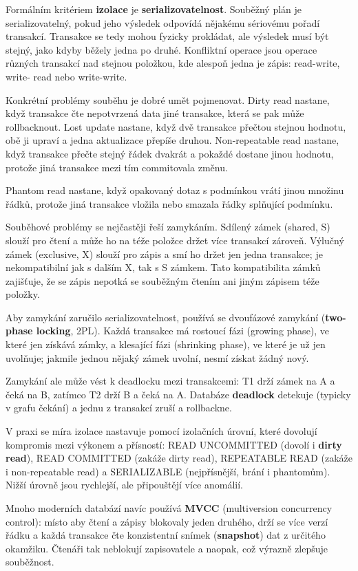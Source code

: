 \documentclass[11pt,a4paper]{article}
\begin{document}
Formálním kritériem \textbf{izolace} je \textbf{serializovatelnost}. Souběžný plán je serializovatelný, pokud jeho výsledek odpovídá nějakému sériovému pořadí transakcí. Transakce se tedy mohou fyzicky prokládat, ale výsledek musí být stejný, jako kdyby běžely jedna po druhé. Konfliktní operace jsou operace různých transakcí nad stejnou položkou, kde alespoň jedna je zápis: read-write, write- read nebo write-write.

Konkrétní problémy souběhu je dobré umět pojmenovat. Dirty read nastane, když transakce čte nepotvrzená data jiné transakce, která se pak může rollbacknout. Lost update nastane, když dvě transakce přečtou stejnou hodnotu, obě ji upraví a jedna aktualizace přepíše druhou. Non-repeatable read nastane, když transakce přečte stejný řádek dvakrát a pokaždé dostane jinou hodnotu, protože jiná transakce mezi tím commitovala změnu.

Phantom read nastane, když opakovaný dotaz s podmínkou vrátí jinou množinu řádků, protože jiná transakce vložila nebo smazala řádky splňující podmínku.

Souběhové problémy se nejčastěji řeší zamykáním. Sdílený zámek (shared, S) slouží pro čtení a může ho na téže položce držet více transakcí zároveň. Výlučný zámek (exclusive, X) slouží pro zápis a smí ho držet jen jedna transakce; je nekompatibilní jak s dalším X, tak s S zámkem. Tato kompatibilita zámků zajišťuje, že se zápis nepotká se souběžným čtením ani jiným zápisem téže položky.

Aby zamykání zaručilo serializovatelnost, používá se dvoufázové zamykání (\textbf{two-phase locking}, 2PL). Každá transakce má rostoucí fázi (growing phase), ve které jen získává zámky, a klesající fázi (shrinking phase), ve které je už jen uvolňuje; jakmile jednou nějaký zámek uvolní, nesmí získat žádný nový.

Zamykání ale může vést k deadlocku mezi transakcemi: T1 drží zámek na A a čeká na B, zatímco T2 drží B a čeká na A. Databáze \textbf{deadlock} detekuje (typicky v grafu čekání) a jednu z transakcí zruší a rollbackne.

V praxi se míra izolace nastavuje pomocí izolačních úrovní, které dovolují kompromis mezi výkonem a přísností: READ UNCOMMITTED (dovolí i \textbf{dirty read}), READ COMMITTED (zakáže dirty read), REPEATABLE READ (zakáže i non-repeatable read) a SERIALIZABLE (nejpřísnější, brání i phantomům). Nižší úrovně jsou rychlejší, ale připouštějí více anomálií.

Mnoho moderních databází navíc používá \textbf{MVCC} (multiversion concurrency control): místo aby čtení a zápisy blokovaly jeden druhého, drží se více verzí řádku a každá transakce čte konzistentní snímek (\textbf{snapshot}) dat z určitého okamžiku. Čtenáři tak neblokují zapisovatele a naopak, což výrazně zlepšuje souběžnost.
\end{document}
